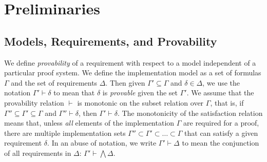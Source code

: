 
\section{Preliminaries}
\label{sec:background}
\newcommand{\satisfies}{\vdash_{\!\!s}}
\newcommand{\nsatisfies}{\nvdash_{\!\!s}}
\newcommand{\bool}[0]{\mathit{bool}}
\newcommand{\reach}[0]{\mathit{R}}
\newcommand{\ite}[3]{\mathit{if}\ {#1}\ \mathit{then}\ {#2}\ \mathit{else}\ {#3}}
\newcommand{\nondetcov}{\text{\sc Nondet-Cov}}
\newcommand{\mutcov}{\text{\sc Mutant-Cov}}

\subsection{Models, Requirements, and Provability}

We define \emph{provability} of a requirement with respect to a model independent of a particular proof system.  We define the implementation model as a set of formulas $\Gamma$  and the set of requirements $\Delta$.
Then given $\Gamma' \subseteq \Gamma$ and $\delta \in \Delta$, we use the notation $\Gamma' \vdash \delta$ to mean that $\delta$ is \emph{provable} given the set $\Gamma'$.  We assume that the provability relation $\vdash$ is monotonic on the subset relation over $\Gamma$, that is, if $\Gamma'' \subseteq \Gamma' \subseteq \Gamma$ and $\Gamma'' \vdash \delta$, then $\Gamma' \vdash \delta$.  The monotonicity of the satisfaction relation means that, unless {\em all} elements of the implementation $\Gamma$ are required for a proof, there are multiple implementation sets $\Gamma'' \subset \Gamma' \subset \ldots \subset \Gamma$ that can satisfy a given requirement $\delta$.  In an abuse of notation, we write $\Gamma' \vdash \Delta$ to mean the conjunction of all requirements in $\Delta$: $\Gamma' \vdash \bigwedge \Delta$.

